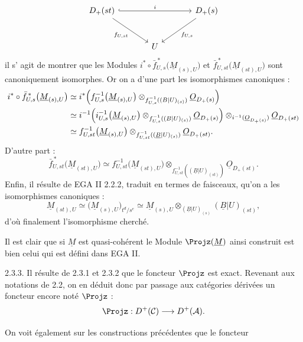 
\[
\begin{tikzcd}[column sep=large,row sep=large]
D_+(st) \arrow[rr,hook,"i"] \arrow[dr,"f_{U,st}"'] & &
D_+(s) \arrow[dl,"f_{U,s}"]\\
& U &
\end{tikzcd}
\]
il s'%
agit de montrer que les Modules \(i^*\circ\bar f_{U,s}^{\,*}\bigl(\underline{M}_{(s),U}\bigr)\) et \(\bar f_{U,st}^{\,*}\bigl(\underline{M}_{(st),U}\bigr)\)
sont canoniquement isomorphes. Or on a d'une part les isomorphismes canoniques :
\[
\begin{aligned}
i^*\circ\bar f_{U,s}^{\,*}\bigl(\underline{M}_{(s),U}\bigr)
&\simeq
i^*\Bigl(f_{U,s}^{-1}\bigl(\underline{M}_{(s),U}\bigr)
 \otimes_{f_{U,s}^{-1}((B|U)_{(s)})}\underline{O}_{D_+(s)}\Bigr)\\
&\simeq
i^{-1}\Bigl(i_{U,s}^{-1}\bigl(\underline{M}_{(s),U}\bigr)
 \otimes_{f_{U,s}^{-1}((B|U)_{(s)})}\underline{O}_{D_+(s)}\Bigr)
 \otimes_{i^{-1}(\underline{O}_{D_+(s)})}\underline{O}_{D_+(st)}\\
&\simeq
f_{U,st}^{-1}\bigl(\underline{M}_{(s),U}\bigr)
 \otimes_{f_{U,st}^{-1}((\underline{B}|U)_{(s)})}\underline{O}_{D_+(st)} .
\end{aligned}
\]
D'autre part :
\[
  \bar f_{U,st}^{\,*}\bigl(\underline{M}_{(st),U}\bigr)
  \simeq
  f_{U,st}^{-1}\bigl(\underline{M}_{(st),U}\bigr)
  \otimes_{f_{U,st}^{-1}((\underline{B}|U)_{(st)})}\underline{O}_{D_+(st)} .
\]
Enfin, il résulte de EGA II 2.2.2, traduit en termes de faisceaux, qu'on a les isomorphismes canoniques :
\[
  \underline{M}_{(st),U}\simeq
  \bigl(\underline{M}_{(s),U}\bigr)_{t^d/s^e}
  \simeq
  \underline{M}_{(s),U}\otimes_{(\underline{B}|U)_{(s)}}(\underline{B}|U)_{(st)},
\]
d'où finalement l'isomorphisme cherché.

Il est clair que si \(\underline{M}\) est quasi-cohérent le Module \(\Projz(\underline{M})\) ainsi construit est bien celui qui est défini dans EGA II.

2.3.3. Il résulte de 2.3.1 et 2.3.2 que le foncteur \(\Projz\) est exact. Revenant aux notations de 2.2, on en déduit donc par passage aux catégories dérivées un foncteur encore noté \(\Projz\) :
\[
  \Projz:D^+(\mathcal C)\longrightarrow D^+(\mathcal A).
\]

On voit également sur les constructions précédentes que le foncteur
